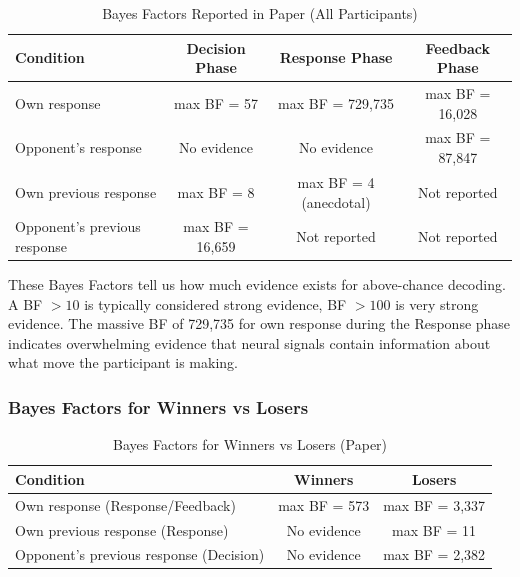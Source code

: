 \documentclass[11pt,a4paper]{article}
\newcommand{\thead}[1]{\textbf{\color{white}\sffamily #1}}
\newcommand{\theadrow}{\rowcolor{tabheader}}
\newcommand{\taltrow}{\rowcolor{softgray}}
\newenvironment{styledtable}{%
  \small\sffamily
  \renewcommand{\arraystretch}{1.35}%
}{}
\begin{document}
\begin{table}[H]
\centering
\caption{Bayes Factors Reported in Paper (All Participants)}
\label{tab:paper_bf_all}
\begin{styledtable}
\begin{tabular}{@{} >{\raggedright\arraybackslash}p{4.2cm} c c c @{}}
\theadrow
\thead{Condition} & \thead{Decision Phase} & \thead{Response Phase} & \thead{Feedback Phase} \\
\midrule
Own response & max BF = 57 & max BF = 729,735 & max BF = 16,028 \\
\taltrow Opponent's response & No evidence & No evidence & max BF = 87,847 \\
Own previous response & max BF = 8 & max BF = 4 (anecdotal) & Not reported \\
\taltrow Opponent's previous response & max BF = 16,659 & Not reported & Not reported \\
\bottomrule
\end{tabular}
\end{styledtable}
\end{table}

These Bayes Factors tell us how much evidence exists for above-chance decoding. A BF $> 10$ is typically considered strong evidence, BF $> 100$ is very strong evidence. The massive BF of 729,735 for own response during the Response phase indicates overwhelming evidence that neural signals contain information about what move the participant is making.

\subsubsection{Bayes Factors for Winners vs Losers}

\begin{table}[H]
\centering
\caption{Bayes Factors for Winners vs Losers (Paper)}
\label{tab:paper_bf_wl}
\begin{styledtable}
\begin{tabular}{@{} >{\raggedright\arraybackslash}p{5.5cm} c c @{}}
\theadrow
\thead{Condition} & \thead{Winners} & \thead{Losers} \\
\midrule
Own response (Response/Feedback) & max BF = 573 & max BF = 3,337 \\
\taltrow Own previous response (Response) & No evidence & max BF = 11 \\
Opponent's previous response (Decision) & No evidence & max BF = 2,382 \\
\bottomrule
\end{tabular}
\end{styledtable}
\end{table}
\end{document}
